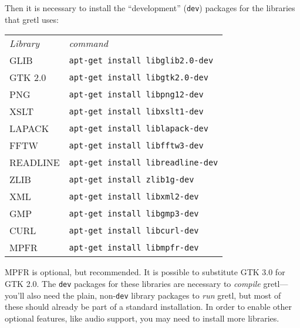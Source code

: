 Then it is necessary to install the ``development'' (\texttt{dev})
packages for the libraries that gretl uses:
\begin{center}
  \begin{tabular}{ll}
    \textit{Library} & \textit{command} \\ [4pt]
    GLIB     & \texttt{apt-get install libglib2.0-dev} \\
    GTK 2.0  & \texttt{apt-get install libgtk2.0-dev} \\
    PNG      & \texttt{apt-get install libpng12-dev} \\
    XSLT     & \texttt{apt-get install libxslt1-dev} \\
    LAPACK   & \texttt{apt-get install liblapack-dev} \\
    FFTW     & \texttt{apt-get install libfftw3-dev} \\
    READLINE & \texttt{apt-get install libreadline-dev} \\
    ZLIB     & \texttt{apt-get install zlib1g-dev} \\
    XML      & \texttt{apt-get install libxml2-dev} \\
    GMP      & \texttt{apt-get install libgmp3-dev} \\
    CURL     & \texttt{apt-get install libcurl-dev} \\
    MPFR     & \texttt{apt-get install libmpfr-dev}
  \end{tabular}
\end{center}

MPFR is optional, but recommended. It is possible to substitute GTK
3.0 for GTK 2.0.  The \texttt{dev} packages for these libraries are
necessary to \emph{compile} gretl---you'll also need the
plain, non-\texttt{dev} library packages to \emph{run} gretl,
but most of these should already be part of a standard installation.
In order to enable other optional features, like audio support, you
may need to install more libraries.


